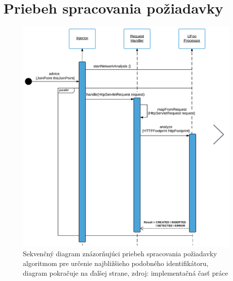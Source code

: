 \documentclass[
  printed, %
  table,   %
  lof,     %
  nolot,   %
  nocover
]{fithesis3}
\begin{document}
\chapter{Priebeh spracovania požiadavky}
\label{fig:appendix-impl-flow}
\begin{figure}[H]
  \centering
    \includegraphics[width=1\textwidth]{images/footprint-impl-flow-1.png}
  \caption{Sekvenčný diagram znázorňujúci priebeh spracovania požiadavky algoritmom
  pre určenie najbližšieho podobného identifikátoru, diagram pokračuje na ďalšej strane,
  zdroj: implementačná časť práce}
\end{figure}
\end{document}
